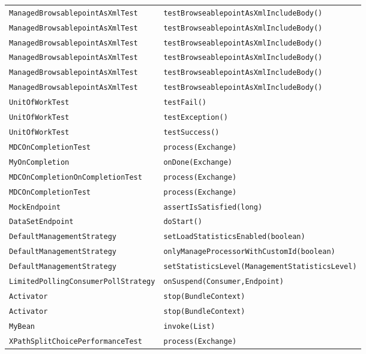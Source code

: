\begin{center}
\begin{longtable}{ll}
\lstinline/ManagedBrowsablepointAsXmlTest/&{\lstinline/testBrowseablepointAsXmlIncludeBody()/}\\
\lstinline/ManagedBrowsablepointAsXmlTest/&{\lstinline/testBrowseablepointAsXmlIncludeBody()/}\\
\lstinline/ManagedBrowsablepointAsXmlTest/&{\lstinline/testBrowseablepointAsXmlIncludeBody()/}\\
\lstinline/ManagedBrowsablepointAsXmlTest/&{\lstinline/testBrowseablepointAsXmlIncludeBody()/}\\
\lstinline/ManagedBrowsablepointAsXmlTest/&{\lstinline/testBrowseablepointAsXmlIncludeBody()/}\\
\lstinline/ManagedBrowsablepointAsXmlTest/&{\lstinline/testBrowseablepointAsXmlIncludeBody()/}\\
\lstinline/UnitOfWorkTest/&{\lstinline/testFail()/}\\
\lstinline/UnitOfWorkTest/&{\lstinline/testException()/}\\
\lstinline/UnitOfWorkTest/&{\lstinline/testSuccess()/}\\
\lstinline/MDCOnCompletionTest/&{\lstinline/process(Exchange)/}\\
\lstinline/MyOnCompletion/&{\lstinline/onDone(Exchange)/}\\
\lstinline/MDCOnCompletionOnCompletionTest/&{\lstinline/process(Exchange)/}\\
\lstinline/MDCOnCompletionTest/&{\lstinline/process(Exchange)/}\\
\lstinline/MockEndpoint/&{\lstinline/assertIsSatisfied(long)/}\\
\lstinline/DataSetEndpoint/&{\lstinline/doStart()/}\\
\lstinline/DefaultManagementStrategy/&{\lstinline/setLoadStatisticsEnabled(boolean)/}\\
\lstinline/DefaultManagementStrategy/&{\lstinline/onlyManageProcessorWithCustomId(boolean)/}\\
\lstinline/DefaultManagementStrategy/&{\lstinline/setStatisticsLevel(ManagementStatisticsLevel)/}\\
\lstinline/LimitedPollingConsumerPollStrategy/&{\lstinline/onSuspend(Consumer,Endpoint)/}\\
\lstinline/Activator/&{\lstinline/stop(BundleContext)/}\\
\lstinline/Activator/&{\lstinline/stop(BundleContext)/}\\
\lstinline/MyBean/&{\lstinline/invoke(List)/}\\
\lstinline/XPathSplitChoicePerformanceTest/&{\lstinline/process(Exchange)/}\\

\end{longtable}
\end{center}
